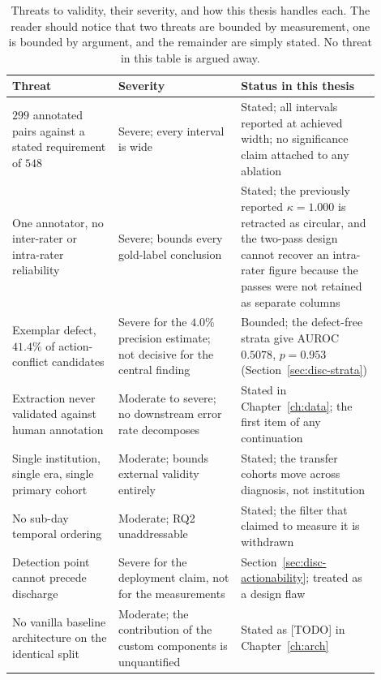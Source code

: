 \begin{table}[t]
\centering
\small
\begin{tabular}{p{0.26\linewidth}p{0.30\linewidth}p{0.34\linewidth}}
\toprule
\textbf{Threat} & \textbf{Severity} & \textbf{Status in this thesis} \\
\midrule
$299$ annotated pairs against a stated requirement of $548$
& Severe; every interval is wide
& Stated; all intervals reported at achieved width; no significance claim
  attached to any ablation \\
\addlinespace
One annotator, no inter-rater or intra-rater reliability
& Severe; bounds every gold-label conclusion
& Stated; the previously reported $\kappa = 1.000$ is retracted as circular, and
  the two-pass design cannot recover an intra-rater figure because the passes
  were not retained as separate columns \\
\addlinespace
Exemplar defect, $41.4\%$ of action-conflict candidates
& Severe for the $4.0\%$ precision estimate; not decisive for the central
  finding
& Bounded; the defect-free strata give AUROC $0.5078$, $p = 0.953$
  (Section~\ref{sec:disc-strata}) \\
\addlinespace
Extraction never validated against human annotation
& Moderate to severe; no downstream error rate decomposes
& Stated in Chapter~\ref{ch:data}; the first item of any continuation \\
\addlinespace
Single institution, single era, single primary cohort
& Moderate; bounds external validity entirely
& Stated; the transfer cohorts move across diagnosis, not institution \\
\addlinespace
No sub-day temporal ordering
& Moderate; RQ2 unaddressable
& Stated; the filter that claimed to measure it is withdrawn \\
\addlinespace
Detection point cannot precede discharge
& Severe for the deployment claim, not for the measurements
& Section~\ref{sec:disc-actionability}; treated as a design flaw \\
\addlinespace
No vanilla baseline architecture on the identical split
& Moderate; the contribution of the custom components is unquantified
& Stated as [TODO] in Chapter~\ref{ch:arch} \\
\bottomrule
\end{tabular}
\caption{Threats to validity, their severity, and how this thesis handles each.
The reader should notice that two threats are bounded by measurement, one is
bounded by argument, and the remainder are simply stated. No threat in this
table is argued away.}
\label{tab:disc-threats}
\end{table}

